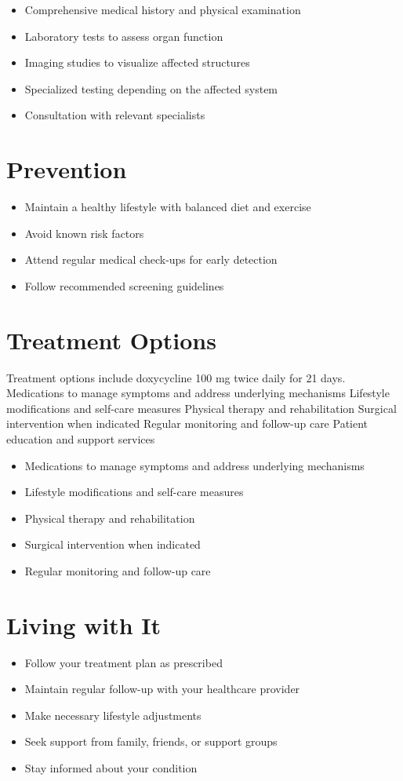 \begin{itemize}[noitemsep]
  \item Comprehensive medical history and physical examination
  \item Laboratory tests to assess organ function
  \item Imaging studies to visualize affected structures
  \item Specialized testing depending on the affected system
  \item Consultation with relevant specialists
\end{itemize}
\section{Prevention}
\begin{itemize}[noitemsep]
  \item Maintain a healthy lifestyle with balanced diet and exercise
  \item Avoid known risk factors
  \item Attend regular medical check-ups for early detection
  \item Follow recommended screening guidelines
\end{itemize}
\section{Treatment Options}
Treatment options include doxycycline 100 mg twice daily for 21 days. Medications to manage symptoms and address underlying mechanisms Lifestyle modifications and self-care measures Physical therapy and rehabilitation Surgical intervention when indicated Regular monitoring and follow-up care Patient education and support services

\begin{itemize}[noitemsep]
  \item Medications to manage symptoms and address underlying mechanisms
  \item Lifestyle modifications and self-care measures
  \item Physical therapy and rehabilitation
  \item Surgical intervention when indicated
  \item Regular monitoring and follow-up care
\end{itemize}
\section{Living with It}
\begin{itemize}[noitemsep]
  \item Follow your treatment plan as prescribed
  \item Maintain regular follow-up with your healthcare provider
  \item Make necessary lifestyle adjustments
  \item Seek support from family, friends, or support groups
  \item Stay informed about your condition
\end{itemize}
